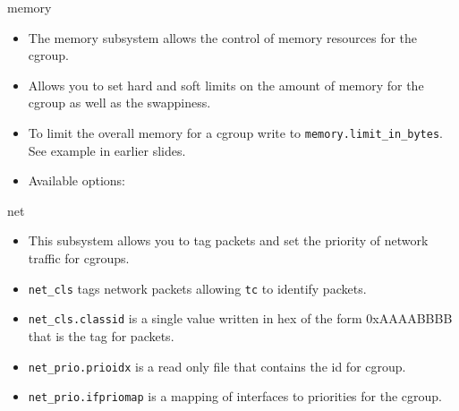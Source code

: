 \documentclass[pdf]{beamer}
\begin{document}
\begin{frame}{memory}
\begin{itemize}
\item The memory subsystem allows the control of memory resources for the cgroup.
\item Allows you to set hard and soft limits on the amount of memory for the cgroup as well as the swappiness.
\item  To limit the overall memory for a cgroup write to \texttt{memory.limit\_in\_bytes}. See example in earlier slides.
\item Available options:
\tiny
{}
\end{itemize}
     
\end{frame}


\begin{frame}{net}
\begin{itemize}
\item This subsystem allows you to tag packets and set the priority of network traffic for cgroups.
\item \texttt{net\_cls} tags network packets allowing \texttt{tc} to identify packets.
\item \texttt{net\_cls.classid} is a single value written in hex of the form 0xAAAABBBB that is the tag for packets.
\item \texttt{net\_prio.prioidx} is a read only file that contains the id for cgroup.
\item \texttt{net\_prio.ifpriomap} is a mapping of interfaces to priorities for the cgroup.
\end{itemize}
\end{frame}
\end{document}

